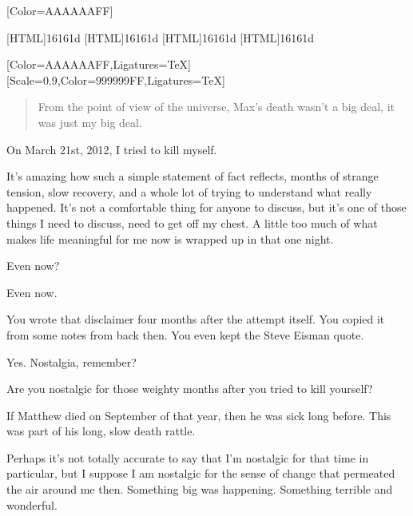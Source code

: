 \label{selfharm:suicide}
\renewfontfamily{}[Color=AAAAAAFF]

[HTML]{16161d}
[HTML]{16161d}
[HTML]{16161d}
[HTML]{16161d}
\begin{paracol}{2}
\begin{leftcolumn}

[Color=AAAAAAFF,Ligatures=TeX]
\renewfontfamily{}[Scale=0.9,Color=999999FF,Ligatures=TeX]

\begin{quotation}
  \noindent From the point of view of the universe, Max's death wasn't a big deal, it was just my big deal.
\end{quotation}

\noindent On March 21st, 2012, I tried to kill myself.

It's amazing how such a simple statement of fact reflects, months of strange tension, slow recovery, and a whole lot of trying to understand what really happened. It's not a comfortable thing for anyone to discuss, but it's one of those things I need to discuss, need to get off my chest. A little too much of what makes life meaningful for me now is wrapped up in that one night.

\begin{ally}
Even now?
\end{ally}
Even now.

\begin{ally}
You wrote that disclaimer four months after the attempt itself. You copied it from some notes from back then. You even kept the Steve Eisman quote.
\end{ally}
Yes. Nostalgia, remember?

\begin{ally}
Are you nostalgic for those weighty months after you tried to kill yourself?
\end{ally}
If Matthew died on September of that year, then he was sick long before. This was part of his long, slow death rattle.

Perhaps it's not totally accurate to say that I'm nostalgic for that time in particular, but I suppose I am nostalgic for the sense of change that permeated the air around me then. Something big was happening. Something terrible and wonderful.


\end{leftcolumn}
\end{paracol}
